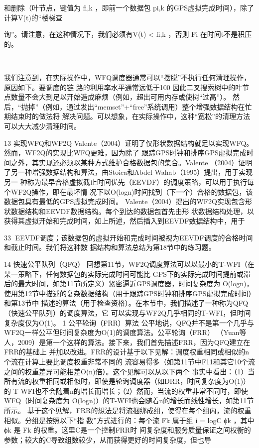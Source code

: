 和删除（叶节点，键值为 fi,k ，即前一个数据包 pi,k 的GPS虚拟完成时间），除了计算V(t)的“楼梯查
               ​                             ​   ​




询”。请注意，在这种情况下，我们必须有V(t) < fi,k ，否则 Fi 在时间t不是积压的。
                   ​                 ​




                                 ​       ​




我们注意到，在实际操作中，WFQ调度器通常可以“摆脱”不执行任何清理操作，原因如下。要调度的链
路的利用率水平通常远低于100%
因此二叉搜索树中的叶节点数量不会大到足以开始造成麻烦（例如，超出可用内存或使树“过高”）。
然后，“抛掉”（例如，通过发出“memset”+“free”系统调用）整个增强数据结构在忙期结束时的做法将
解决问题。可以想象，在实际操作中，这种“宽松”的清理方法可以大大减少清理时间。

13 实现WFQ和WF2Q
Valente（2004）证明了仅形状数据结构就足以实现WFQ。然而，WF2Q的实现比WFQ更难，因为除了
跟踪GPS时钟和排序GPS虚拟完成时间之外，其实现还必须以某种方式维护合格数据包的集合。Valente
（2004）证明了另一种增强数据结构和算法，由Stoica和Abdel-Wahab（1995）提出，用于实现另一
种称为最早合格虚拟截止时间优先（EEVDF）的调度策略，可以用于执行每个WF2Q操作，即在最坏情
况下以O(logn)时间找到（下一个）合格的数据包，该数据包具有最低的GPS虚拟完成时间。
Valente（2004）提出的WF2Q实现包含形状数据结构和EEVDF数据结构。每个到达的数据包首先由形
状数据结构处理，以获得其虚拟开始和完成时间，如上所述，然后插入到EEVDF数据结构中，用于

                                                          33
EEVDF调度；该数据包的虚拟开始和完成时间被视为EEVDF调度的合格时间和截止时间。我们将这种数
据结构和算法总结为第18节中的练习题。

14 快速公平队列（QFQ）
回想第11节，WF2Q调度算法可以以最小的T-WFI（在某一策略下，任何数据包的实际完成时间可能比
GPS下的实际完成时间提前或滞后的最大时间，如第11节所定义）紧密逼近GPS调度器，时间复杂度为
O(logn)，使用第12节中描述的复杂数据结构（用于跟踪GPS时钟和排序GPS虚拟完成时间）和第13节中
描述的算法（用于检查资格）。在本节中，我们描述了一种称为QFQ（快速公平队列）的调度算法，它
可以实现与WF2Q几乎相同的T-WFI，但时间复杂度仅为O(1)。
1 公平轮询（FRR）算法
公平地说，QFQ并不是第一个几乎与WF2Q一样公平但时间复杂度为O(1)的调度算法。公平轮询（FRR）
（Yuan等人，2009）是第一个这样的算法。接下来，我们首先描述FRR，因为QFQ建立在FRR的基础上
并加以改进。FRR的设计基于以下见解：调度权重相同或相似的n个流在计算上要比调度权重非常不同的
流容易得多（如第11节中F11和其它10个流之间的权重差异可能相差O(n)倍）。这个见解可以从以下两个
事实中看出：（1）当所有流的权重相同或相似时，即使是轮询调度器（如DRR，时间复杂度为O(1)）的
T-WFI也不会随着n的增长而增长；（2）然而，当流的权重非常不同时，即使WFQ（时间复杂度为
O(logn)）的T-WFI也会随着n的增长而线性增长，如第11节所示。
基于这个见解，FRR的想法是将流捆绑成组，使得在每个组内，流的权重相似。分组是按照以下“指
数”方式进行的：每个流 Fk 属于组 i = logC ϕk ，其中 ϕk 是 Fk 的权重。这里C是一个控制FRR时
间复杂度和服务质量保证之间权衡的参数；较大的C导致组数较少，从而获得更好的时间复杂度，但也导
                 ​            ​           ​   ​




